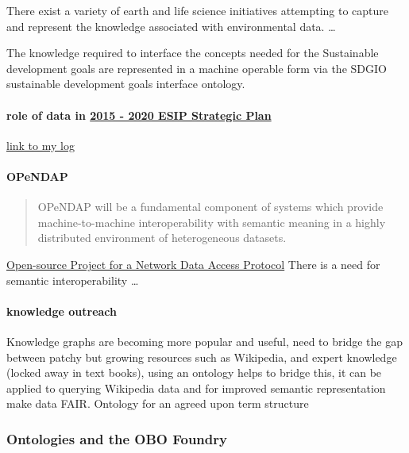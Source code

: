 \documentclass[]{article}
\let\oldparagraph\paragraph
\renewcommand{\paragraph}[1]{\oldparagraph{#1}\mbox{}}
\begin{document}
There exist a variety of earth and life science initiatives attempting
to capture and represent the knowledge associated with environmental
data. \ldots{}

The knowledge required to interface the concepts needed for the
Sustainable development goals are represented in a machine operable form
via the SDGIO sustainable development goals interface ontology.

\hypertarget{role-of-data-in-2015---2020-esip-strategic-plan}{%
\paragraph{\texorpdfstring{role of data in
\href{http://wiki.esipfed.org/index.php/2015-2020_Strategic_Plan}{2015 -
2020 ESIP Strategic
Plan}}{role of data in 2015 - 2020 ESIP Strategic Plan}}\label{role-of-data-in-2015---2020-esip-strategic-plan}}

\href{https://github.com/kaiiam/kblumberg_masters_thesis/wiki/log\#080118}{link
to my log}

\hypertarget{opendap}{%
\paragraph{OPeNDAP}\label{opendap}}

\begin{quote}
OPeNDAP will be a fundamental component of systems which provide
machine-to-machine interoperability with semantic meaning in a highly
distributed environment of heterogeneous datasets.
\end{quote}

\href{https://www.opendap.org/about}{Open-source Project for a Network
Data Access Protocol} There is a need for semantic interoperability
\ldots{}

\hypertarget{knowledge-outreach}{%
\paragraph{knowledge outreach}\label{knowledge-outreach}}

Knowledge graphs are becoming more popular and useful, need to bridge
the gap between patchy but growing resources such as Wikipedia, and
expert knowledge (locked away in text books), using an ontology helps to
bridge this, it can be applied to querying Wikipedia data and for
improved semantic representation make data FAIR. Ontology for an agreed
upon term structure

\hypertarget{ontologies-and-the-obo-foundry}{%
\subsubsection{Ontologies and the OBO
Foundry}\label{ontologies-and-the-obo-foundry}}
\end{document}
